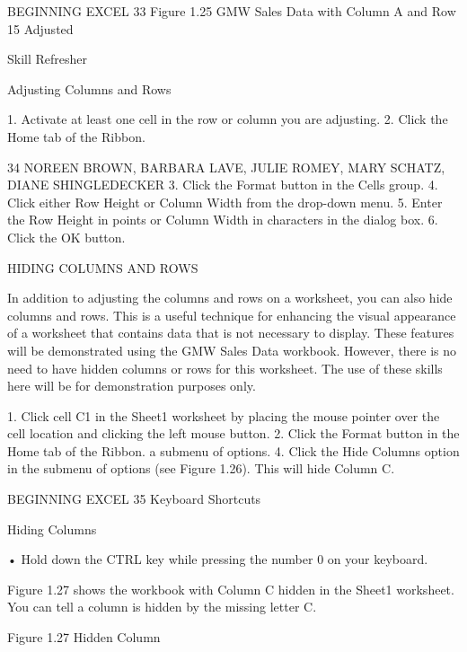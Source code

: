 BEGINNING EXCEL 33
Figure 1.25 GMW Sales Data with Column A and Row 15 Adjusted




Skill Refresher


Adjusting Columns and Rows

1. Activate at least one cell in the row or column you are adjusting.
2. Click the Home tab of the Ribbon.



34 NOREEN BROWN, BARBARA LAVE, JULIE ROMEY, MARY SCHATZ, DIANE SHINGLEDECKER
3. Click the Format button in the Cells group.
4. Click either Row Height or Column Width from the drop-down menu.
5. Enter the Row Height in points or Column Width in characters in the dialog box.
6. Click the OK button.




HIDING COLUMNS AND ROWS

In addition to adjusting the columns and rows on a worksheet, you can also hide columns and rows.
This is a useful technique for enhancing the visual appearance of a worksheet that contains data that is
not necessary to display. These features will be demonstrated using the GMW Sales Data workbook.
However, there is no need to have hidden columns or rows for this worksheet. The use of these skills
here will be for demonstration purposes only.

1. Click cell C1 in the Sheet1 worksheet by placing the mouse pointer over the cell location and
clicking the left mouse button.
2. Click the Format button in the Home tab of the Ribbon.
a submenu of options.
4. Click the Hide Columns option in the submenu of options (see Figure 1.26). This will hide
Column C.








BEGINNING EXCEL 35
Keyboard Shortcuts


Hiding Columns

• Hold down the CTRL key while pressing the number 0 on your keyboard.



Figure 1.27 shows the workbook with Column C hidden in the Sheet1 worksheet. You can tell a
column is hidden by the missing letter C.




Figure 1.27 Hidden Column


